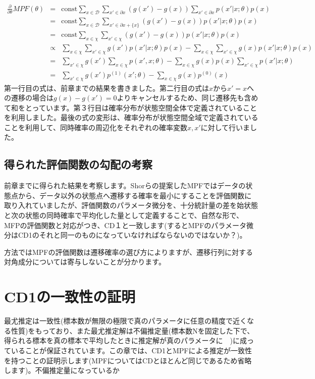 \documentclass[11pt]{article}
\begin{document}
\begin{eqnarray}
\frac{\partial}{\partial \theta} MPF(\theta)&=&\text{const}\sum_{x\in {\mathcal D}}\sum_{x'\in \partial x}(g(x')-g(x))\sum_{x'\in \partial x}p(x'|x;\theta)p(x)\\
&=&\text{const}\sum_{x\in {\mathcal D}}\sum_{x'\in \partial x+\{x\}}(g(x')-g(x))p(x'|x;\theta)p(x)\\
&=&\text{const}\sum_{x\in \chi}\sum_{x'\in \chi}(g(x')-g(x))p(x'|x;\theta)p(x)\\
&\propto&\sum_{x\in \chi}\sum_{x'\in \chi}g(x')p(x'|x;\theta)p(x) -\sum_{x\in \chi}\sum_{x'\in \chi}g(x)p(x'|x;\theta)p(x)\\
&=&\sum_{x'\in \chi}g(x')\sum_{x\in \chi}p(x',x;\theta) -\sum_{x\in \chi}g(x)p(x)\sum_{x'\in \chi}p(x'|x;\theta)\\
&=&\sum_{x'\in \chi}g(x')p^{(1)}(x';\theta) -\sum_{x\in \chi}g(x)p^{(0)}(x)
\end{eqnarray}
第一行目の式は、前章までの結果を書きました。第二行目の式は$x$から$x'=x$への遷移の場合は$g(x)-g(x')=0$よりキャンセルするため、同じ遷移先も含めて和をとっています。第３行目は確率分布が状態空間全体で定義されていることを利用しました。最後の式の変形は、確率分布が状態空間全域で定義されていることを利用して、同時確率の周辺化をそれぞれの確率変数$x,x'$に対して行いました。
\subsection{得られた評価関数の勾配の考察}
前章までに得られた結果を考察します。Shorらの提案したMPF\cite{shor}ではデータの状態点から、データ以外の状態点へ遷移する確率を最小にすることを評価関数に取り入れていましたが、評価関数のパラメータ微分を、十分統計量の差を始状態と次の状態の同時確率で平均化した量として定義することで、自然な形で、MFPの評価関数と対応がつき、CD１と一致します(するとMPFのパラメータ微分はCD1のそれと同一のものになっていなければならないのではないか？)。

方法ではMPFの評価関数は遷移確率の選び方によりますが、遷移行列に対する対角成分については寄与しないことが分かります。

\section{CD1の一致性の証明}
最尤推定は一致性(標本数が無限の極限で真のパラメータに任意の精度で近くなる性質)をもっており、また最尤推定解は不偏推定量(標本数Nを固定した下で、得られる標本を真の標本で平均したときに推定解が真のパラメータに　)に成っていることが保証されています。この章では、CD1とMPFによる推定が一致性を持つことの証明示します(MPFについてはCDとほとんど同じであるため省略します)。不偏推定量になっているか
\end{document}
